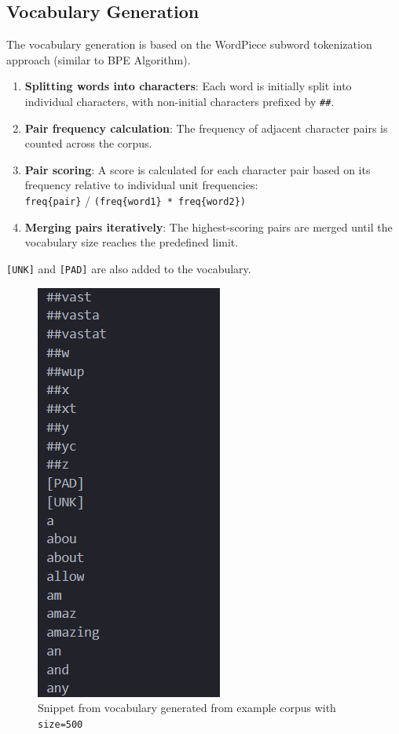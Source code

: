 \documentclass{article}
\begin{document}
\subsection{Vocabulary Generation}
The vocabulary generation is based on the WordPiece subword tokenization approach (similar to BPE Algorithm).
\begin{enumerate}
    \item \textbf{Splitting words into characters}: Each word is initially split into individual characters, with non-initial characters prefixed by \texttt{\#\#}.
    \item \textbf{Pair frequency calculation}: The frequency of adjacent character pairs is counted across the corpus.
    \item \textbf{Pair scoring}: A score is calculated for each character pair based on its frequency relative to individual unit frequencies:\\ \texttt{freq\{pair\}} / \texttt{(freq\{word1\} * freq\{word2\})}
    \item \textbf{Merging pairs iteratively}: The highest-scoring pairs are merged until the vocabulary size reaches the predefined limit.
\end{enumerate}
\texttt{[UNK]} and \texttt{[PAD]} are also added to the vocabulary.

\begin{figure}[H]
    \centering
    \includegraphics[width=0.35\linewidth]{image4.png}
    \caption{Snippet from vocabulary generated from example corpus with \texttt{size=500}}
    \label{fig:enter-task1}
\end{figure}
\end{document}
